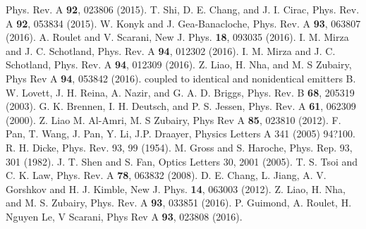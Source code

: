\documentclass[aps,pra,twocolumn,floatfix,superscriptaddress]{revtex4}
\begin{document}
\begin{thebibliography}{5}
Phys. Rev. A {\bf 92}, 023806 (2015).
 T. Shi, D. E. Chang, and J. I. Cirac, 
Phys. Rev. A {\bf 92}, 053834 (2015).
 W. Konyk and J. Gea-Banacloche, 
Phys. Rev. A {\bf 93}, 063807 (2016).
 A. Roulet and V. Scarani, 
New J. Phys. {\bf 18},  093035 (2016).
 I. M. Mirza and J. C. Schotland, Phys. Rev. A {\bf 94}, 012302 (2016).
 I. M. Mirza and J. C. Schotland, Phys. Rev. A {\bf 94}, 012309 (2016).
 Z. Liao, H. Nha, and M. S Zubairy, Phys Rev A {\bf 94}, 053842 (2016).
coupled to identical and nonidentical emitters
 B. W. Lovett, J. H. Reina, A. Nazir, and G. A. D. Briggs,
Phys. Rev. B {\bf 68}, 205319 (2003).
 G. K. Brennen, I. H. Deutsch, and P. S. Jessen, 
Phys. Rev. A {\bf 61}, 062309 (2000).
 Z. Liao M. Al-Amri, M. S Zubairy, Phys Rev A {\bf 85}, 023810 (2012).
 F. Pan, T. Wang, J. Pan, Y. Li, J.P. Draayer, Physics Letters A 341 (2005) 94?100.
 R. H. Dicke, Phys. Rev. 93, 99  (1954).
 M. Gross and S. Haroche, Phys. Rep. 93, 301 (1982).
 J. T. Shen and S. Fan, Optics Letters 30, 2001 (2005).
 T. S. Tsoi and C. K. Law, Phys. Rev. A {\bf 78}, 063832 (2008).
  D. E. Chang, L. Jiang, A. V. Gorshkov and H. J. Kimble, New J. Phys. {\bf 14}, 063003 (2012).
 Z. Liao, H. Nha, and M. S. Zubairy, Phys. Rev. A {\bf 93}, 033851 (2016).
 P. Guimond, A. Roulet, H. Nguyen Le, V Scarani, Phys Rev A {\bf 93}, 023808 (2016).

\end{thebibliography}
\end{document}
